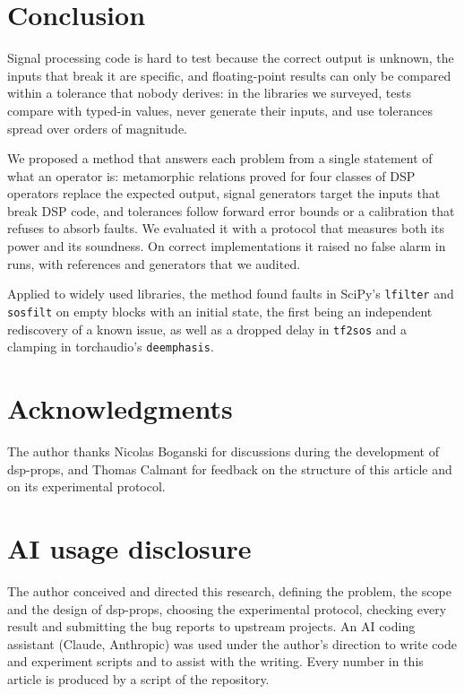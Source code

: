 \documentclass[10pt,conference]{IEEEtran}
\newcommand{\code}[1]{\texttt{#1}}
\begin{document}
\section{Conclusion}
\label{sec:conclusion}
Signal processing code is hard to test because the correct output is unknown,
the inputs that break it are specific, and floating-point results can only be
compared within a tolerance that nobody derives: in the libraries we surveyed,
tests compare with typed-in values, never generate their inputs, and use
tolerances spread over \surveyScipyTolDecades{} orders of magnitude.

We proposed a method that answers each problem from a single statement of what
an operator is: metamorphic relations proved for four classes of DSP operators
replace the expected output, signal generators target the inputs that break DSP
code, and tolerances follow forward error bounds or a calibration that refuses
to absorb faults. We evaluated it with a protocol that measures both its power
and its soundness. \conclusionResult{} On correct implementations it raised no
false alarm in \fpRuns{} runs, with references and generators that we audited.

Applied to widely used libraries, the method found faults in SciPy's
\code{lfilter} and \code{sosfilt} on empty blocks with an initial state, the
first being an independent rediscovery of a known issue, as well as a dropped
delay in \code{tf2sos} and a clamping in torchaudio's \code{deemphasis}.
\reportedUpstream

\section*{Acknowledgments}
The author thanks Nicolas Boganski for discussions during the development of
dsp-props, and Thomas Calmant for feedback on the structure of this article
and on its experimental protocol.

\section*{AI usage disclosure}
The author conceived and directed this research, defining the problem, the
scope and the design of dsp-props, choosing the experimental protocol, checking
every result and submitting the bug reports to upstream projects. An AI coding
assistant (Claude, Anthropic) was used under the author's direction to write code and
experiment scripts and to assist with the writing. Every number in this article
is produced by a script of the repository.
\end{document}
